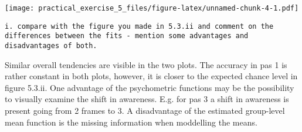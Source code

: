 \documentclass[
]{article}
\newenvironment{Shaded}{\begin{snugshade}}{\end{snugshade}}
\newcommand{\AttributeTok}[1]{\textcolor[rgb]{0.77,0.63,0.00}{#1}}
\newcommand{\DecValTok}[1]{\textcolor[rgb]{0.00,0.00,0.81}{#1}}
\newcommand{\FunctionTok}[1]{\textcolor[rgb]{0.00,0.00,0.00}{#1}}
\newcommand{\NormalTok}[1]{#1}
\newcommand{\OtherTok}[1]{\textcolor[rgb]{0.56,0.35,0.01}{#1}}
\newcommand{\SpecialCharTok}[1]{\textcolor[rgb]{0.00,0.00,0.00}{#1}}
\newcommand{\StringTok}[1]{\textcolor[rgb]{0.31,0.60,0.02}{#1}}
\begin{document}
\begin{Shaded}
\end{Shaded}

\texttt{[image: practical\_exercise\_5\_files/figure-latex/unnamed-chunk-4-1.pdf]}

\begin{verbatim}
i. compare with the figure you made in 5.3.ii and comment on the differences between the fits - mention some advantages and disadvantages of both.
\end{verbatim}

Similar overall tendencies are visible in the two plots. The accuracy in
pas 1 is rather constant in both plots, however, it is closer to the
expected chance level in figure 5.3.ii. One advantage of the
psychometric functions may be the possibility to visually examine the
shift in awareness. E.g. for pas 3 a shift in awareness is present going
from 2 frames to 3. A disadvantage of the estimated group-level mean
function is the missing information when moddelling the means.
\end{document}
